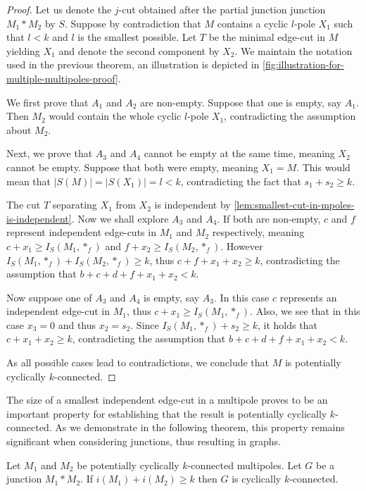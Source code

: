 \documentclass[12pt, twoside]{book}
\begin{document}
\begin{proof}
	Let us denote the $j$-cut obtained after the partial junction junction $M_1*M_2$ by $S$. Suppose by contradiction that $M$ contains a cyclic $l$-pole $X_1$ such that $l<k$ and $l$ is the smallest possible. Let $T$ be the minimal edge-cut in $M$ yielding $X_1$ and denote the second component by $X_2$. We maintain the notation used in the previous theorem, an illustration is depicted in \cref{fig:illustration-for-multiple-multipoles-proof}.
	
	We first prove that $A_1$ and $A_2$ are non-empty. Suppose that one is empty, say $A_1$. Then $M_2$ would contain the whole cyclic $l$-pole $X_1$, contradicting the assumption about $M_2$.
	
	Next, we prove that $A_3$ and $A_4$ cannot be empty at the same time, meaning $X_2$ cannot be empty. Suppose that both were empty, meaning $X_1=M$. This would mean that $|S(M)|=|S(X_1)|=l<k$, contradicting the fact that $s_1+s_2\geq k$.
	
	The cut $T$ separating $X_1$ from $X_2$ is independent by \cref{lem:smallest-cut-in-mpoles-is-independent}. Now we shall explore $A_3$ and $A_4$. If both are non-empty, $c$ and $f$ represent independent edge-cuts in $M_1$ and $M_2$ respectively, meaning ${c+x_1\geq I_S(M_1, *_f)}$ and ${f+x_2\geq I_S(M_2, *_f)}$. However ${I_S(M_1, *_f)+I_S(M_2, *_f)\geq k}$, thus $c+f+x_1+x_2\geq k$, contradicting the assumption that ${b+c+d+f+x_1+x_2<k}$.
	
	Now suppose one of $A_3$ and $A_4$ is empty, say $A_3$. In this case $c$ represents an independent edge-cut in $M_1$, thus ${c+x_1\geq I_S(M_1, *_f)}$. Also, we see that in this case $x_3=0$ and thus $x_2=s_2$. Since ${I_S(M_1, *_f)+s_2\geq k}$, it holds that $c+x_1+x_2\geq k$, contradicting the assumption that ${b+c+d+f+x_1+x_2<k}$.
	
	As all possible cases lead to contradictions, we conclude that $M$ is potentially cyclically \mbox{$k$-connected}.
\end{proof}

The size of a smallest independent edge-cut in a multipole proves to be an important property for establishing that the result is potentially cyclically $k$-connected. As we demonstrate in the following theorem, this property remains significant when considering junctions, thus resulting in graphs.

\begin{theorem}\label{th:cyclic-edge-connectivity-of-potentially-with-independent-cuts}
	Let $M_1$ and $M_2$ be potentially cyclically $k$-connected multipoles. Let $G$ be a junction $M_1*M_2$. If $i(M_1)+i(M_2)\geq k$ then $G$ is cyclically $k$-connected.
\end{theorem}
\end{document}
